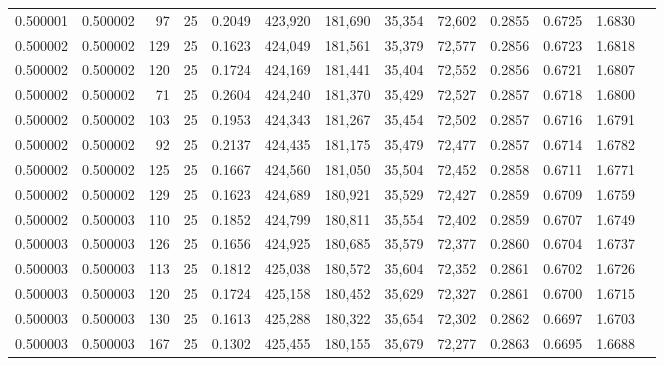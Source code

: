 \begin{tabular}{rrrrrrrrrrrrr}
0.500001 & 0.500002 &    97 &  25 &                                     0.2049 & 423,920 & 181,690 &  35,354 &  72,602 & 0.2855 & 0.6725 & 1.6830 \\
0.500002 & 0.500002 &   129 &  25 &                                     0.1623 & 424,049 & 181,561 &  35,379 &  72,577 & 0.2856 & 0.6723 & 1.6818 \\
0.500002 & 0.500002 &   120 &  25 &                                     0.1724 & 424,169 & 181,441 &  35,404 &  72,552 & 0.2856 & 0.6721 & 1.6807 \\
0.500002 & 0.500002 &    71 &  25 &                                     0.2604 & 424,240 & 181,370 &  35,429 &  72,527 & 0.2857 & 0.6718 & 1.6800 \\
0.500002 & 0.500002 &   103 &  25 &                                     0.1953 & 424,343 & 181,267 &  35,454 &  72,502 & 0.2857 & 0.6716 & 1.6791 \\
0.500002 & 0.500002 &    92 &  25 &                                     0.2137 & 424,435 & 181,175 &  35,479 &  72,477 & 0.2857 & 0.6714 & 1.6782 \\
0.500002 & 0.500002 &   125 &  25 &                                     0.1667 & 424,560 & 181,050 &  35,504 &  72,452 & 0.2858 & 0.6711 & 1.6771 \\
0.500002 & 0.500002 &   129 &  25 &                                     0.1623 & 424,689 & 180,921 &  35,529 &  72,427 & 0.2859 & 0.6709 & 1.6759 \\
0.500002 & 0.500003 &   110 &  25 &                                     0.1852 & 424,799 & 180,811 &  35,554 &  72,402 & 0.2859 & 0.6707 & 1.6749 \\
0.500003 & 0.500003 &   126 &  25 &                                     0.1656 & 424,925 & 180,685 &  35,579 &  72,377 & 0.2860 & 0.6704 & 1.6737 \\
0.500003 & 0.500003 &   113 &  25 &                                     0.1812 & 425,038 & 180,572 &  35,604 &  72,352 & 0.2861 & 0.6702 & 1.6726 \\
0.500003 & 0.500003 &   120 &  25 &                                     0.1724 & 425,158 & 180,452 &  35,629 &  72,327 & 0.2861 & 0.6700 & 1.6715 \\
0.500003 & 0.500003 &   130 &  25 &                                     0.1613 & 425,288 & 180,322 &  35,654 &  72,302 & 0.2862 & 0.6697 & 1.6703 \\
0.500003 & 0.500003 &   167 &  25 &                                     0.1302 & 425,455 & 180,155 &  35,679 &  72,277 & 0.2863 & 0.6695 & 1.6688 \\

\end{tabular}
